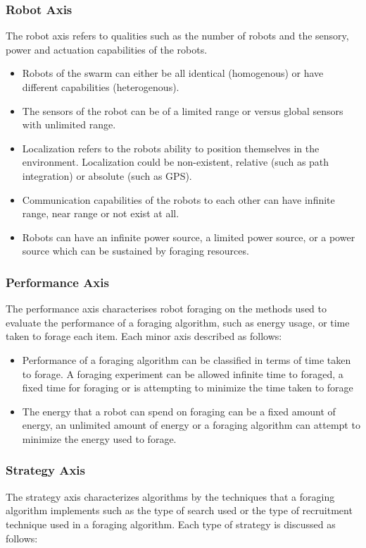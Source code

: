 \subsubsection{Robot Axis}
The robot axis refers to qualities such as  the number of robots and the sensory, power and actuation capabilities of the robots. 
\begin{itemize}
\item Robots of the swarm can either be all identical (homogenous) or have different capabilities (heterogenous).  
\item The sensors of the robot can be of a limited range or  versus global sensors with unlimited range. 
\item Localization refers to the robots ability to position themselves in the environment. Localization could be non-existent, relative (such as path integration) or absolute (such as GPS).
\item Communication capabilities of the robots to each other can have infinite range, near range or not exist at all.
\item Robots can have an infinite power source, a limited power source, or a power source which can be sustained by foraging resources.
\end{itemize}

\subsubsection{Performance Axis}
The performance axis characterises robot foraging on the methods used to evaluate the performance of a foraging algorithm, such as energy usage, or time taken to forage each item. Each minor axis described as follows:

\begin{itemize}
\item Performance of a foraging algorithm can be classified in terms of time taken to forage. A foraging experiment can be allowed infinite time to foraged, a fixed time for foraging or is attempting to minimize the time taken to forage
\item The energy that a robot can spend on foraging can be a fixed amount of energy, an unlimited amount of energy or a foraging algorithm can attempt to minimize the energy used to forage.
\end{itemize}

\subsubsection{Strategy Axis}
The strategy axis characterizes algorithms by the techniques that a foraging algorithm implements such as the type of search used or the type of recruitment technique used in a foraging algorithm. Each type of strategy is discussed as follows:

